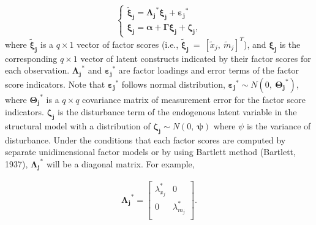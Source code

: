 \documentclass[
  11pt,
  man]{apa6}
\begin{document}
\begin{equation}
    \begin{cases}
      \boldsymbol{\tilde{\xi}_{j}} = \boldsymbol{\Lambda_{j}}^\text{*}\boldsymbol{\xi_{j}} + \boldsymbol{\varepsilon_{j}}^\text{*} \\
      \boldsymbol{\xi_{j}} = \boldsymbol{\alpha} + \boldsymbol{\Gamma}\boldsymbol{\xi_{j}} + \boldsymbol{\zeta_{j}}, 
    \end{cases}       
\end{equation}
where \(\boldsymbol{\tilde{\xi}_{j}}\) is a \(q \times 1\) vector of factor scores (i.e., \(\boldsymbol{\tilde{\xi}_{j}} \ = \ [\tilde{x}_{j}, \ \tilde{m}_{j}]^T\)), and \(\boldsymbol{\xi_{j}}\) is the corresponding \(q \times 1\) vector of latent constructs indicated by their factor scores for each observation. \(\boldsymbol{\Lambda_{j}}^\text{*}\) and \(\boldsymbol{\varepsilon_{j}}^\text{*}\) are factor loadings and error terms of the factor score indicators. Note that \(\boldsymbol{\varepsilon_{j}}^\text{*}\) follows normal distribution, \(\boldsymbol{\varepsilon_{j}}^\text{*} \sim N(0, \ \boldsymbol{\Theta_{j}}^\text{*})\), where \(\boldsymbol{\Theta_{j}}^\text{*}\) is a \(q \times q\) covariance matrix of measurement error for the factor score indicators. \(\boldsymbol{\zeta_{j}}\) is the disturbance term of the endogenous latent variable in the structural model with a distribution of \(\boldsymbol{\zeta_{j}} \sim N(0, \ \boldsymbol{\psi})\) where \(\psi\) is the variance of disturbance. Under the conditions that each factor scores are computed by separate unidimensional factor models or by using Bartlett method (Bartlett, 1937), \(\boldsymbol{\Lambda_{j}}^\text{*}\) will be a diagonal matrix. For example,

\begin{align}
\boldsymbol{\Lambda_{j}}^\text{*} = 
    \begin{bmatrix}
        \lambda_{x_{j}}^\text{*} & 0 \\
        0 & \lambda_{m_{j}}^\text{*} \\ 
    \end{bmatrix}.
\end{align}
\end{document}
